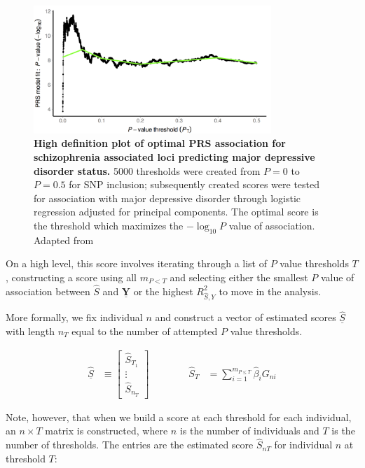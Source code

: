 \begin{figure}[h]
\label{pt}
\centering
\includegraphics[width=0.8\textwidth]{Figures/pt.png}
\caption[Optimal \ac{PRS} construction and interpretation.]{\textbf{High definition plot of optimal \ac{PRS} association for schizophrenia associated loci predicting major depressive disorder status.} 5000 thresholds were created from $P = 0$ to $P=0.5$ for \ac{SNP} inclusion; subsequently created scores were tested for association with major depressive disorder through logistic regression adjusted for principal components. The optimal score is the threshold which maximizes the $-\log_{10} P$ value of association. Adapted from \cite{Euesden2014}}
\end{figure}

On a high level, this score involves iterating through a list of $P$ value thresholds $T$, constructing a score using all $m_{P < T}$ and selecting either the smallest $P$ value of association between $\hat{S}$ and $\underline{\mathbf{Y}}$ or the highest $R^2_{\hat{S}, Y}$ to move in the analysis. 

More formally, we fix individual $n$ and construct a vector of estimated scores $\underline{\hat{S}}$ with length $n_T$ equal to the number of attempted $P$ value thresholds. 

$$ \begin{aligned} \underline{\hat{S}} &\equiv \begin{bmatrix} \hat{S}_{T_1} \\ \vdots \\ \hat{S}_{n_T} \end{bmatrix} &&&&& \hat{S}_T &= \sum^{m_{P \leq T}}_{i=1} \hat{\beta}_i G_{ni} \end{aligned}$$

Note, however, that when we build a score at each threshold for each individual, an $n \times T$ matrix is constructed, where $n$ is the number of individuals and $T$ is the number of thresholds. The entries are the estimated score $\hat{S}_{nT}$ for individual $n$ at threshold $T$:

